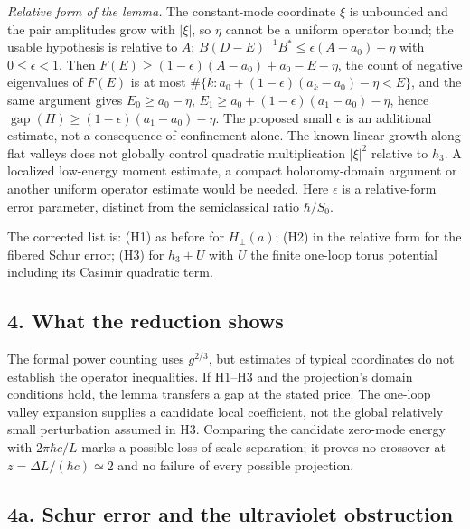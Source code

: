 \documentclass[11pt,a4paper]{article}
\begin{document}
\emph{Relative form of the lemma.} The constant-mode coordinate \(\xi\)
is unbounded and the pair amplitudes grow with \(|\xi|\), so \(\eta\)
cannot be a uniform operator bound; the usable hypothesis is relative to
\(A\): \(B(D-E)^{-1}B^*\le\epsilon(A-a_0)+\eta\) with
\(0\le\epsilon<1\). Then \(F(E)\ge(1-\epsilon)(A-a_0)+a_0-E-\eta\), the
count of negative eigenvalues of \(F(E)\) is at most
\(\#\{k:a_0+(1-\epsilon)(a_k-a_0)-\eta<E\}\), and the same argument
gives \(E_0\ge a_0-\eta\), \(E_1\ge a_0+(1-\epsilon)(a_1-a_0)-\eta\),
hence \(\operatorname{gap}(H)\ge(1-\epsilon)(a_1-a_0)-\eta\). The
proposed small \(\epsilon\) is an additional estimate, not a consequence
of confinement alone. The known linear growth along flat valleys does
not globally control quadratic multiplication \(|\xi|^2\) relative to
\(h_3\). A localized low-energy moment estimate, a compact
holonomy-domain argument or another uniform operator estimate would be
needed. Here \(\epsilon\) is a relative-form error parameter, distinct
from the semiclassical ratio \(\hbar/S_0\).

The corrected list is: (H1) as before for \(H_\perp(a)\); (H2) in the
relative form for the fibered Schur error; (H3) for \(h_3+U\) with \(U\)
the finite one-loop torus potential including its Casimir quadratic
term.

\hypertarget{what-the-reduction-shows}{%
\subsection{4. What the reduction
shows}\label{what-the-reduction-shows}}

The formal power counting uses \(g^{2/3}\), but estimates of typical
coordinates do not establish the operator inequalities. If H1--H3 and
the projection's domain conditions hold, the lemma transfers a gap at
the stated price. The one-loop valley expansion supplies a candidate
local coefficient, not the global relatively small perturbation assumed
in H3. Comparing the candidate zero-mode energy with \(2\pi\hbar c/L\)
marks a possible loss of scale separation; it proves no crossover at
\(z=\Delta L/(\hbar c)\simeq2\) and no failure of every possible
projection.

\hypertarget{a.-schur-error-and-the-ultraviolet-obstruction}{%
\subsection{4a. Schur error and the ultraviolet
obstruction}\label{a.-schur-error-and-the-ultraviolet-obstruction}}
\end{document}
